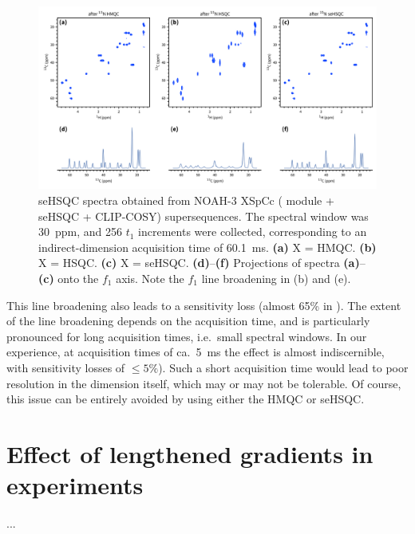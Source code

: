 \begin{figure}
    \centering
    \includegraphics[width=\textwidth]{./figures/n15_linebroadening.png}
    \caption{
        \carbon{} seHSQC spectra obtained from NOAH-3 XSpCc (\nitrogen{} module + \carbon{} seHSQC + CLIP-COSY) supersequences.
        \grami{}
        The \nitrogen{} spectral window was \SI{30}{ppm}, and 256 $t_1$ increments were collected, corresponding to an indirect-dimension \nitrogen{} acquisition time of \SI{60.1}{\ms}.
        \textbf{(a)} X = HMQC.
        \textbf{(b)} X = HSQC.
        \textbf{(c)} X = seHSQC.
        \textbf{(d)}--\textbf{(f)} Projections of spectra \textbf{(a)}--\textbf{(c)} onto the $f_1$ axis.
        Note the $f_1$ line broadening in (b) and (e).
    }
    \label{fig:n15_linebroadening}
\end{figure}

This line broadening also leads to a sensitivity loss (almost 65\% in ).
The extent of the line broadening depends on the acquisition time, and is particularly pronounced for long acquisition times, i.e.\ small \nitrogen{} spectral windows.
In our experience, at \nitrogen{} acquisition times of ca.\ \SI{5}{\ms} the effect is almost indiscernible, with sensitivity losses of $\leq 5\%$).
Such a short acquisition time would lead to poor resolution in the \nitrogen{} dimension itself, which may or may not be tolerable.
Of course, this issue can be entirely avoided by using either the HMQC or seHSQC.


\section{Effect of lengthened gradients in \texorpdfstring{\nitrogen{}}{15N} experiments}

...

